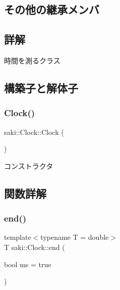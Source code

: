 \subsection*{その他の継承メンバ}


\subsection{詳解}
時間を測るクラス 

\subsection{構築子と解体子}
\mbox{\label{classsaki_1_1_clock_a235372b9a2044bab90f38c117b49d3ab}} 
\subsubsection{\texorpdfstring{Clock()}{Clock()}}
{\footnotesize\ttfamily saki\+::\+Clock\+::\+Clock (\begin{DoxyParamCaption}{ }\end{DoxyParamCaption})\hspace{0.3cm}{\ttfamily [inline]}}



コンストラクタ 



\subsection{関数詳解}
\mbox{\label{classsaki_1_1_clock_afb3a41ac314bb58c010283bea60069f9}} 
\subsubsection{\texorpdfstring{end()}{end()}}
{\footnotesize\ttfamily template$<$typename T  = double$>$ \\
T saki\+::\+Clock\+::end (\begin{DoxyParamCaption}\item[{bool}]{ms = {\ttfamily true} }\end{DoxyParamCaption})\hspace{0.3cm}{\ttfamily [inline]}}



